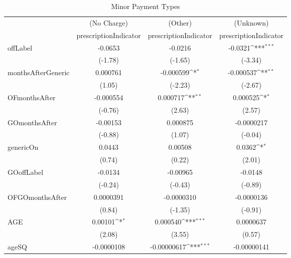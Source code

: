 \begin{table}[htbp]\centering
\def\sym#1{\ifmmode^{#1}\else\(^{#1}\)\fi}
\caption{Minor Payment Types\label{tab1}}
\begin{tabular}{l*{3}{c}}
\hline\hline
            &\multicolumn{1}{c}{(No Charge)}&\multicolumn{1}{c}{(Other)}&\multicolumn{1}{c}{(Unknown)}\\
            &\multicolumn{1}{c}{prescriptionIndicator}&\multicolumn{1}{c}{prescriptionIndicator}&\multicolumn{1}{c}{prescriptionIndicator}\\
\hline
offLabel    &     -0.0653         &     -0.0216         &     -0.0321\sym{***}\\
            &     (-1.78)         &     (-1.65)         &     (-3.34)         \\
[1em]
monthsAfterGeneric&    0.000761         &   -0.000599\sym{*}  &   -0.000537\sym{**} \\
            &      (1.05)         &     (-2.23)         &     (-2.67)         \\
[1em]
OFmonthsAfter&   -0.000554         &    0.000717\sym{**} &    0.000525\sym{*}  \\
            &     (-0.76)         &      (2.63)         &      (2.57)         \\
[1em]
GOmonthsAfter&    -0.00153         &    0.000875         &  -0.0000217         \\
            &     (-0.88)         &      (1.07)         &     (-0.04)         \\
[1em]
genericOn   &      0.0443         &     0.00508         &      0.0362\sym{*}  \\
            &      (0.74)         &      (0.22)         &      (2.01)         \\
[1em]
GOoffLabel  &     -0.0134         &    -0.00965         &     -0.0148         \\
            &     (-0.24)         &     (-0.43)         &     (-0.89)         \\
[1em]
OFGOmonthsAfter&   0.0000391         &  -0.0000310         &  -0.0000136         \\
            &      (0.84)         &     (-1.35)         &     (-0.91)         \\
[1em]
AGE         &     0.00101\sym{*}  &    0.000540\sym{***}&   0.0000637         \\
            &      (2.08)         &      (3.55)         &      (0.57)         \\
[1em]
ageSQ       &  -0.0000108         & -0.00000617\sym{***}& -0.00000141         \\

\end{tabular}
\end{table}
